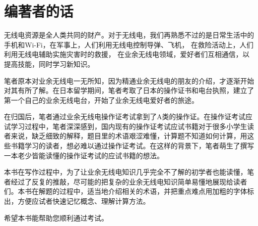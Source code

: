 \chapter*{编著者的话}

无线电资源是全人类共同的财产。对于无线电，我们再熟悉不过的是日常生活中的手机和Wi-Fi，在军事上，人们利用无线电控制导弹、飞机，%
在救险活动上，人们利用无线电辅助实施灾害时的救援，%
在业余无线电领域，爱好者们互相通信，以提高技能，同时学习新知识。

笔者原本对业余无线电一无所知，因为精通业余无线电的朋友的介绍，才逐渐开始对其有所了解。在日本留学期间，笔者考取了日本的操作证书和电台执照，建立了第一个自己的业余无线电台，开始了业余无线电爱好者的旅途。

在归国后，笔者通过业余无线电操作证考试拿到了A类的操作证。在操作证考试应试学习过程中，笔者深深感到，国内现有的操作证考试应试书籍对于很多小学生读者来说，缺乏细致的解释，题目里的术语艰涩难懂，计算题不知道如何计算，用这些书籍学习的读者，想必难以通过操作证考试。在这样的背景下，笔者萌生了撰写一本老少皆能读懂的操作证考试的应试书籍的想法。

本书在写作过程中，为了让业余无线电知识几乎完全不了解的初学者也能读懂，笔者经过了反复的推敲，尽可能的把复杂的业余无线电知识简单易懂地展现给读者们。本书在解题的过程中，适当地介绍相关的术语，并把重点难点用加粗的字体标出，方便应试者快速记忆概念、理解计算方法。

希望本书能帮助您顺利通过考试。


